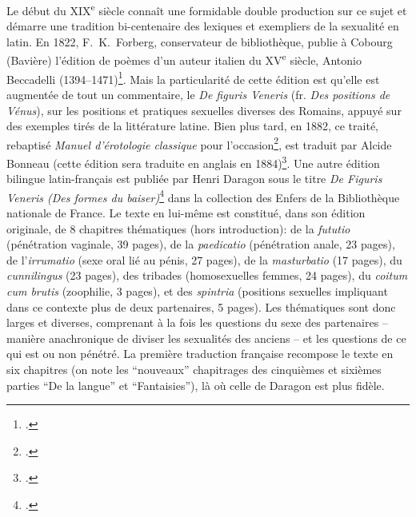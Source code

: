 Le début du XIX\textsuperscript{e} siècle connaît une formidable double production sur ce sujet et démarre une tradition bi-centenaire des lexiques et exempliers de la sexualité en latin. En 1822, F.~K.~Forberg, conservateur de bibliothèque, publie à Cobourg (Bavière) l'édition de poèmes d'un auteur italien du XV\textsuperscript{e} siècle, Antonio Beccadelli (1394--1471)\footcite{beccadelli_antonii_1824}. Mais la particularité de cette édition est qu'elle est augmentée de tout un commentaire, le \textit{De figuris Veneris} (fr. \textit{Des positions de Vénus}), sur les positions et pratiques sexuelles diverses des Romains, appuyé sur des exemples tirés de la littérature latine. Bien plus tard, en 1882, ce traité, rebaptisé \textit{Manuel d'érotologie classique} pour l'occasion\footcite{forberg_manuel_1882}, est traduit par Alcide Bonneau (cette édition sera traduite en anglais en 1884)\footcite{parra1997figuris}. Une autre édition bilingue latin-français est publiée par Henri Daragon sous le titre \textit{De Figuris Veneris (Des formes du baiser)}\footcite{forberg_f_1907} dans la collection des Enfers de la Bibliothèque nationale de France. Le texte en lui-même est constitué, dans son édition originale, de 8 chapitres thématiques (hors introduction): de la \textit{fututio} (pénétration vaginale, 39 pages), de la \textit{paedicatio} (pénétration anale, 23 pages), de l'\textit{irrumatio} (sexe oral lié au pénis, 27 pages), de la \textit{masturbatio} (17 pages), du \textit{cunnilingus} (23 pages), des tribades (homosexuelles femmes, 24 pages), du \textit{coitum cum brutis} (zoophilie, 3 pages), et des \textit{spintria} (positions sexuelles impliquant dans ce contexte plus de deux partenaires, 5 pages). Les thématiques sont donc larges et diverses, comprenant à la fois les questions du sexe des partenaires -- manière anachronique de diviser les sexualités des anciens -- et les questions de ce qui est ou non pénétré. La première traduction française recompose le texte en six chapitres (on note les \enquote{nouveaux} chapitrages des cinquièmes et sixièmes parties \enquote{De la langue} et \enquote{Fantaisies}), là où celle de Daragon est plus fidèle.


